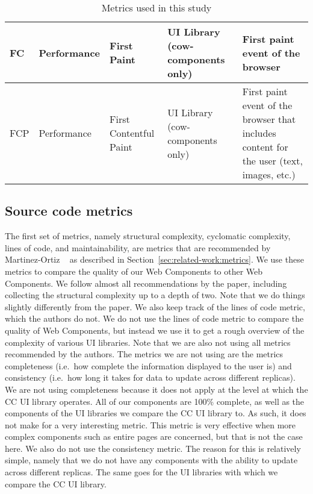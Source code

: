 \begin{table}[htbp]
\begin{tabularx}{\textwidth}{|l|l|l|l|X|}
    FC          & Performance                    & First Paint            & UI Library (cow-components only) & First paint event of the browser                                                                                                  \\ \hline
    FCP         & Performance                    & First Contentful Paint & UI Library (cow-components only) & First paint event of the browser that includes content for the user  (text, images, etc.)                                         \\
  \end{tabularx}
  \caption{Metrics used in this study}
  \label{tab:design:metrics}
\end{table}

\subsection{Source code metrics}
The first set of metrics, namely structural complexity, cyclomatic complexity, lines of code, and maintainability, are metrics that are recommended by Martinez-Ortiz \etal{}~\cite{martinez-ortiz2016quality} as described in Section~\ref{sec:related-work:metrics}. We use these metrics to compare the quality of our Web Components to other Web Components. We follow almost all recommendations by the paper, including collecting the structural complexity up to a depth of two. Note that we do things slightly differently from the paper. We also keep track of the lines of code metric, which the authors do not. We do not use the lines of code metric to compare the quality of Web Components, but instead we use it to get a rough overview of the complexity of various UI libraries. Note that we are also not using all metrics recommended by the authors. The metrics we are not using are the metrics completeness (i.e.~how complete the information displayed to the user is) and consistency (i.e.~how long it takes for data to update across different replicas). We are not using completeness because it does not apply at the level at which the CC UI library operates. All of our components are 100\% complete, as well as the components of the UI libraries we compare the CC UI library to. As such, it does not make for a very interesting metric. This metric is very effective when more complex components such as entire pages are concerned, but that is not the case here. We also do not use the consistency metric. The reason for this is relatively simple, namely that we do not have any components with the ability to update across different replicas. The same goes for the UI libraries with which we compare the CC UI library.

